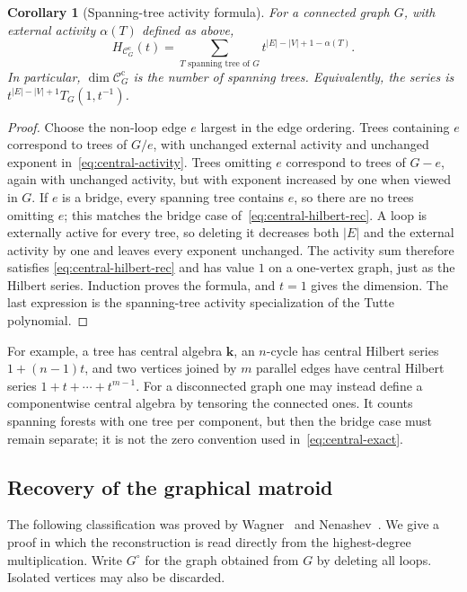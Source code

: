 \documentclass[reqno]{article}
\theoremstyle{plain} %
\newtheorem{corollary}[theorem]{Corollary}
\theoremstyle{definition}
\theoremstyle{remark}
\newcommand{\K} {\mathbf{k}}
\newcommand {\CC}{\mathscr{C}}
\numberwithin{equation}{section}
\begin{document}
\begin{corollary}[Spanning-tree activity formula]\label{cor:central-activity}
For a connected graph $G$, with external activity $\alpha(T)$ defined
as above,
\begin{equation}\label{eq:central-activity}
H_{\CC_G^{\mathrm c}}(t)
=\sum_{T\text{ spanning tree of }G}
 t^{|E|-|V|+1-\alpha(T)}.
\end{equation}
In particular, $\dim\CC_G^{\mathrm c}$ is the number of spanning trees.
Equivalently, the series is $t^{|E|-|V|+1}T_G(1,t^{-1})$.
\end{corollary}
\begin{proof}
Choose the non-loop edge $e$ largest in the edge ordering. Trees
containing $e$ correspond to trees of $G/e$, with unchanged external
activity and unchanged exponent in~\eqref{eq:central-activity}.
Trees omitting $e$ correspond to trees of $G-e$, again with unchanged
activity, but with exponent increased by one when viewed in $G$.
If $e$ is a bridge, every spanning tree contains $e$, so there are no
trees omitting $e$; this matches the bridge case
of~\eqref{eq:central-hilbert-rec}. A loop is externally active for every
tree, so deleting it decreases both $|E|$ and the external activity by
one and leaves every exponent unchanged. The activity sum therefore satisfies
\eqref{eq:central-hilbert-rec} and has value $1$ on a one-vertex graph,
just as the Hilbert series. Induction proves the formula, and $t=1$
gives the dimension. The last expression is the spanning-tree activity
specialization of the Tutte polynomial.
\end{proof}

For example, a tree has central algebra $\K$, an $n$-cycle has central
Hilbert series $1+(n-1)t$, and two vertices joined by $m$ parallel edges
have central Hilbert series $1+t+\cdots+t^{m-1}$.
For a disconnected graph one may instead define a componentwise central
algebra by tensoring the connected ones. It counts spanning forests
with one tree per component, but then the bridge case must remain
separate; it is not the zero convention used in~\eqref{eq:central-exact}.

\subsection{Recovery of the graphical matroid}
\label{sec:matroid-reconstruction}

The following classification was proved by Wagner~\cite[Theorem~1.10]{Wa1} and Nenashev~\cite[Theorem~2.1]{N1}\cite{Ne}.
We give a proof in which the reconstruction is read directly from the
highest-degree multiplication. Write $G^\circ$ for the graph obtained
from $G$ by deleting all loops. Isolated vertices may also be discarded.
\end{document}
